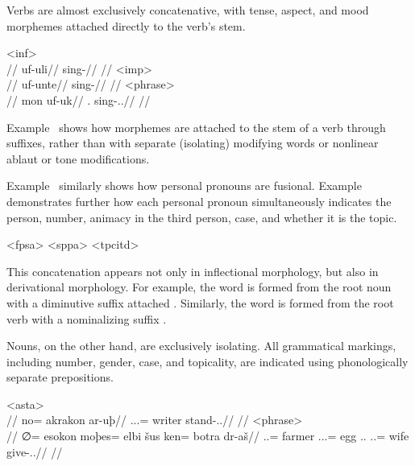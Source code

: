 Verbs are almost exclusively concatenative, with tense, aspect, and mood morphemes attached directly to the verb's stem.

	\a<inf>\begingl
		\glpreamble{}\\
		//
		\gla uf-uli//
		\glb sing-\Inf//
		\glft {}//
	\endgl
	\a<imp>\begingl
		\glpreamble{}\\
		//
		\gla uf-unte//
		\glb sing-\Imp//
		\glft {}//
	\endgl
	\a<phrase>\begingl
		\glpreamble{}\\
		//
		\gla mon uf-uk//
		\glb \Fps.\Top{} sing-\Ind.\Pst.\Pfv//
	\glft {}//
	\endgl
\xe

Example~ shows how morphemes are attached to the stem of a verb through suffixes, rather than with separate (isolating) modifying words or nonlinear ablaut or tone modifications.

Example~ similarly shows how personal pronouns are fusional. Example~ demonstrates further how each personal pronoun simultaneously indicates the person, number, animacy in the third person, case, and whether it is the topic.

	\a<fpsa>    
	\a<sppa>    
	\a<tpcitd>    
\xe

This concatenation appears not only in inflectional morphology, but also in derivational morphology. For example, the word    is formed from the root noun    with a diminutive suffix attached . Similarly, the word    is formed from the root verb    with a nominalizing suffix .

Nouns, on the other hand, are exclusively isolating. All grammatical markings, including number, gender, case, and topicality, are indicated using phonologically separate prepositions.

	\a<asta>\begingl
		\glpreamble{}\\
		//
		\gla no= akrakon ar-uþ//
		\glb \An.\Sg.\Top.\Abs= writer stand-\Ind.\Npst.\Prg//
		\glft {}//
	\endgl
	\a<phrase>\begingl
		\glpreamble{}\\
		//
		\gla ∅= esokon moþes= elbi šus ken= botra dr-aš//
		\glb \An.\Sg.\Abs= farmer \In.\Pc.\Top.\Acc= egg \Tps.\An.\Gen{} \An.\Pl.\Dat= wife give-\Ind.\Npst.\Rtsp//
		\glft {}//
	\endgl
\xe

